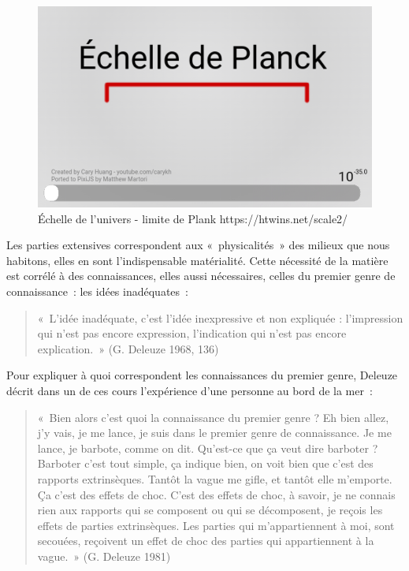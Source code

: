 \documentclass[
  letterpaper,
  DIV=11,
  numbers=noendperiod]{scrreprt}
\begin{document}
\begin{figure}

{\centering \includegraphics{media/100000010000030F000001D7889CE02FB9E347F3.png}

}

\caption{\label{fig-echelleUniversPlank}Échelle de l'univers - limite de
Plank https://htwins.net/scale2/}

\end{figure}

Les parties extensives correspondent aux «~physicalités~» des milieux
que nous habitons, elles en sont l'indispensable matérialité. Cette
nécessité de la matière est corrélé à des connaissances, elles aussi
nécessaires, celles du premier genre de connaissance~: les idées
inadéquates~:

\begin{quote}
«~L'idée inadéquate, c'est l'idée inexpressive et non expliquée :
l'impression qui n'est pas encore expression, l'indication qui n'est pas
encore explication.~» (G. Deleuze 1968, 136)
\end{quote}

Pour expliquer à quoi correspondent les connaissances du premier genre,
Deleuze décrit dans un de ces cours l'expérience d'une personne au bord
de la mer~:

\begin{quote}
«~Bien alors c'est quoi la connaissance du premier genre ? Eh bien
allez, j'y vais, je me lance, je suis dans le premier genre de
connaissance. Je me lance, je barbote, comme on dit. Qu'est-ce que ça
veut dire barboter ? Barboter c'est tout simple, ça indique bien, on
voit bien que c'est des rapports extrinsèques. Tantôt la vague me gifle,
et tantôt elle m'emporte. Ça c'est des effets de choc. C'est des effets
de choc, à savoir, je ne connais rien aux rapports qui se composent ou
qui se décomposent, je reçois les effets de parties extrinsèques. Les
parties qui m'appartiennent à moi, sont secouées, reçoivent un effet de
choc des parties qui appartiennent à la vague.~» (G. Deleuze 1981)
\end{quote}
\end{document}

